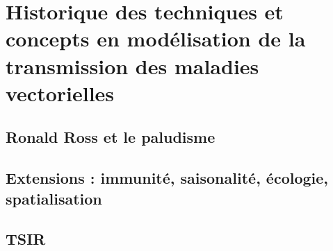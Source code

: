 \chapter{Historique des techniques et concepts en modélisation de la transmission des maladies vectorielles}

\section{Ronald Ross et le paludisme}

\section{Extensions : immunité, saisonalité, écologie, spatialisation}

\section{TSIR}

